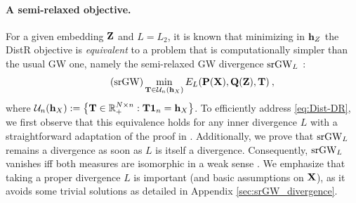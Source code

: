 \paragraph{A semi-relaxed objective.} For a given embedding ${\mathbf{Z}}$ and $L=L_2$, it is known that minimizing in ${\mathbf{h}}_{Z}$ the DistR objective is \emph{equivalent} to a problem that is computationally simpler than the usual GW one, namely the semi-relaxed GW divergence $\operatorname{srGW}_L$ \cite{vincent2021semi}:
\begin{equation*}\tag{srGW} \label{eq:srGW}
	\min_{{\mathbf{T}} \in {\mathcal{U}}_n({\mathbf{h}}_X)} E_L({\mathbf{P}}({\mathbf{X}}), {\mathbf{Q}}({\mathbf{Z}}), {\mathbf{T}}) \:,
\end{equation*}
where ${\mathcal{U}}_n({\mathbf{h}}_X) := \left\{ {\mathbf{T}} \in \mathbb{R}_{+}^{N \times n}: {\mathbf{T}} \bm{1}_n = {\mathbf{h}}_X\right\}$. To efficiently address \cref{eq:Dist-DR}, we first observe that this equivalence holds for any inner divergence $L$ with a straightforward adaptation of the proof in \citet{vincent2021semi}. 
Additionally, we prove that $\operatorname{srGW}_L$ remains a divergence as soon as $L$ is itself a divergence. Consequently, $\operatorname{srGW}_L$ vanishes iff both measures are isomorphic in a weak sense \cite{chowdhury2019gromov}. We emphasize that taking a proper divergence $L$ is important (and basic assumptions on ${\mathbf{X}}$), as it avoids some trivial solutions as detailed in Appendix \ref{sec:srGW_divergence}.





